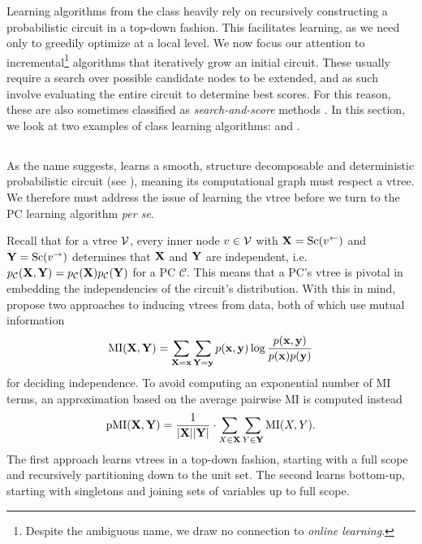 Learning algorithms from the \divclass{} class heavily rely on recursively constructing a
probabilistic circuit in a top-down fashion. This facilitates learning, as we need only to greedily
optimize at a local level. We now focus our attention to incremental\footnote{Despite the ambiguous
name, we draw no connection to \emph{online learning}.} algorithms that iteratively grow an initial
circuit. These usually require a search over possible candidate nodes to be extended, and as such
involve evaluating the entire circuit to determine best scores. For this reason, these are also
sometimes classified as \emph{search-and-score} methods \citep{teyssier05}. In this section, we
look at two examples of \incrclass{} class learning algorithms:  and
.

\subsection{}
\label{sec:learnpsdd}

As the name suggests,  \citep{liang17} learns a smooth, structure decomposable
and deterministic probabilistic circuit (see ), meaning its
computational graph must respect a vtree. We therefore must address the issue of learning the vtree
before we turn to the PC learning algorithm \emph{per se}.

Recall that for a vtree $\operatorname{\mathcal{V}}$, every inner node $v\in\operatorname{\mathcal{V}}$ with $\mathbf{X}=\operatorname*{\normalfont{Sc}}(v^\gets)$ and
$\mathbf{Y}=\operatorname*{\normalfont{Sc}}(v^\to)$ determines that $\mathbf{X}$ and $\mathbf{Y}$ are independent, i.e.\
$p_\mathcal{C}(\mathbf{X},\mathbf{Y})=p_\mathcal{C}(\mathbf{X}) p_\mathcal{C}(\mathbf{Y})$ for a PC
$\mathcal{C}$. This means that a PC's vtree is pivotal in embedding the independencies of the
circuit's distribution. With this in mind, \citet{liang17} propose two approaches to inducing
vtrees from data, both of which use mutual information
\begin{equation*}
  \operatorname{\normalfont{MI}}(\mathbf{X},\mathbf{Y})=\sum_{\mathbf{X}=\mathbf{x}}\sum_{\mathbf{Y}=\mathbf{y}}p(\mathbf{x},\mathbf{y})\log\frac{p(\mathbf{x},\mathbf{y})}{p(\mathbf{x})p(\mathbf{y})}
\end{equation*}
for deciding independence. To avoid computing an exponential number of MI terms, an approximation
based on the average pairwise MI is computed instead
\begin{equation*}
  \operatorname{\normalfont{pMI}}(\mathbf{X},\mathbf{Y})=\frac{1}{|\mathbf{X}||\mathbf{Y}|}\cdot\sum_{X\in\mathbf{X}}\sum_{Y\in\mathbf{Y}}\operatorname{\normalfont{MI}}(X,Y).
\end{equation*}
The first approach learns vtrees in a top-down fashion, starting with a full scope and recursively
partitioning down to the unit set. The second learns bottom-up, starting with singletons and
joining sets of variables up to full scope.


